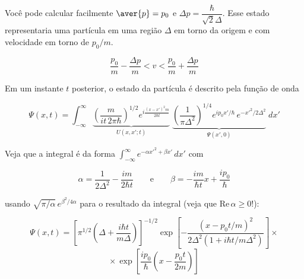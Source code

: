 Você pode calcular facilmente $\aver{p} = p_0$ e $\Delta p = \dfrac{\hbar}{\sqrt{2}\Delta}$. Esse estado representaria uma partícula em uma região $\Delta$ em torno da origem e com velocidade em torno de $p_0/m$.

\begin{center}
\end{center}

\begin{equation}
    \frac{p_0}{m} - \frac{\Delta p}{m} < v < \frac{p_0}{m} + \frac{\Delta p}{m}
\label{eq:aula14_intervalo_velocidade}
\end{equation}

Em um instante $t$ posterior, o estado da partícula é descrito pela função de onda

\begin{equation}
    \Psi(x,t) = \int_{-\infty}^{\infty} \underbrace{\left(\frac{m}{it\, 2\pi\hbar}\right)^{1/2} e^{i\frac{(x-x')^2 m}{2\hbar t}}}_{U(x,x';t)}\; \underbrace{\left(\frac{1}{\pi\Delta^2}\right)^{1/4} e^{ip_0 x'/\hbar}\, e^{-x'^2/2\Delta^2}}_{\Psi(x',0)}\; dx'
\label{eq:aula14_psi_xt_integral}
\end{equation}

Veja que a integral é da forma $\displaystyle\int_{-\infty}^{\infty} e^{-\alpha x'^2 + \beta x'}\, dx'$ com

\begin{equation}
    \alpha = \frac{1}{2\Delta^2} - \frac{im}{2\hbar t} \qquad \text{e} \qquad \beta = -\frac{im}{\hbar t}x + \frac{ip_0}{\hbar}
\label{eq:aula14_alpha_beta}
\end{equation}

usando $\sqrt{\pi/\alpha}\, e^{\beta^2/4\alpha}$ para o resultado da integral (veja que $\text{Re}\,\alpha \geq 0$!):

\begin{equation}
    \Psi(x,t) = \left[\pi^{1/2}\left(\Delta + \frac{i\hbar t}{m\Delta}\right)\right]^{-1/2} \exp\left[-\frac{(x-p_0 t/m)^2}{2\Delta^2(1+i\hbar t/m\Delta^2)}\right] \times
\label{eq:aula14_psi_xt_passo1}
\end{equation}
\begin{equation}
    \times\, \exp\left[\frac{ip_0}{\hbar}\left(x - \frac{p_0 t}{2m}\right)\right]
\label{eq:aula14_psi_xt_passo2}
\end{equation}

